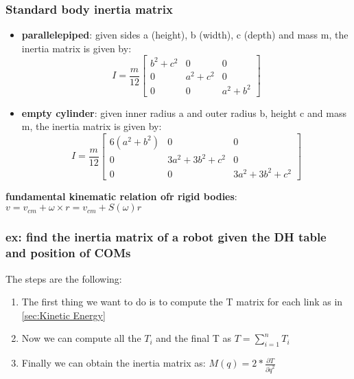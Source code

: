 \documentclass[a4paper,12pt]{article}
\begin{document}
\subsubsection{Standard body inertia matrix}
\begin{itemize}
    \item \textbf{parallelepiped}: given sides a (height), b (width), c (depth)
     and mass m, the inertia matrix is given by: \begin{equation}
        I = \frac{m}{12} \begin{bmatrix}
            b^2 + c^2 & 0 & 0 \\
            0 & a^2 + c^2 & 0 \\
            0 & 0 & a^2 + b^2
        \end{bmatrix}
    \end{equation}
    \item \textbf{empty cylinder}: given inner radius a and outer radius b, height c and mass m,
     the inertia matrix is given by: \begin{equation}
        I = \frac{m}{12} \begin{bmatrix}
            6(a^2 + b^2) & 0 & 0 \\
            0 & 3a^2 + 3b^2 + c^2 & 0 \\
            0 & 0 & 3a^2 + 3b^2 + c^2
        \end{bmatrix}
    \end{equation}
\end{itemize}
\textbf{fundamental kinematic relation ofr rigid bodies}:
 $v = v_{cm} + \omega \times r = v_{cm} + S(\omega) r$
\subsubsection{ex: find the inertia matrix of a robot given the DH table and position of COMs}
The steps are the following:
\begin{enumerate}
    \item The first thing we want to do is to compute the T matrix for each link as in \ref{sec:Kinetic Energy}
    \item Now we can compute all the $T_i$ and the final T as $T = \sum_{i=1}^{n} T_i$
    \item Finally we can obtain the inertia matrix as: $M(q) = 2*\frac{\partial T}{\partial \dot{q}^2}$
\end{enumerate}
\end{document}

